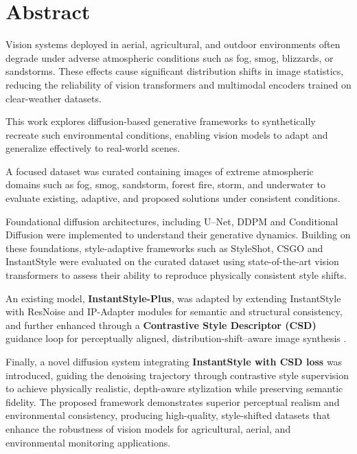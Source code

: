 

\chapter*{\Large \centering Abstract}

Vision systems deployed in aerial, agricultural, and outdoor environments often degrade under adverse atmospheric conditions such as fog, smog, blizzards, or sandstorms.  
These effects cause significant distribution shifts in image statistics, reducing the reliability of vision transformers and multimodal encoders trained on clear-weather datasets.

This work explores diffusion-based generative frameworks to synthetically recreate such environmental conditions, enabling vision models to adapt and generalize effectively to real-world scenes.  

A focused dataset was curated containing images of extreme atmospheric domains such as fog, smog, sandstorm, forest fire, storm, and underwater to evaluate existing, adaptive, and proposed solutions under consistent conditions.

Foundational diffusion architectures, including U–Net, DDPM and Conditional Diffusion were implemented to understand their generative dynamics.  
Building on these foundations, style-adaptive frameworks such as StyleShot, CSGO and InstantStyle  were evaluated on the curated dataset using state-of-the-art vision transformers  to assess their ability to reproduce physically consistent style shifts.

An existing model, \textbf{InstantStyle-Plus}, was adapted by extending InstantStyle with ResNoise  and IP-Adapter  modules for semantic and structural consistency, and further enhanced through a \textbf{Contrastive Style Descriptor (CSD)} guidance loop for perceptually aligned, distribution-shift–aware image synthesis .  

Finally, a novel diffusion system integrating \textbf{InstantStyle with CSD loss} was introduced, guiding the denoising trajectory through contrastive style supervision to achieve physically realistic, depth-aware stylization while preserving semantic fidelity.  
The proposed framework demonstrates superior perceptual realism and environmental consistency, producing high-quality, style-shifted datasets that enhance the robustness of vision models for agricultural, aerial, and environmental monitoring applications.

